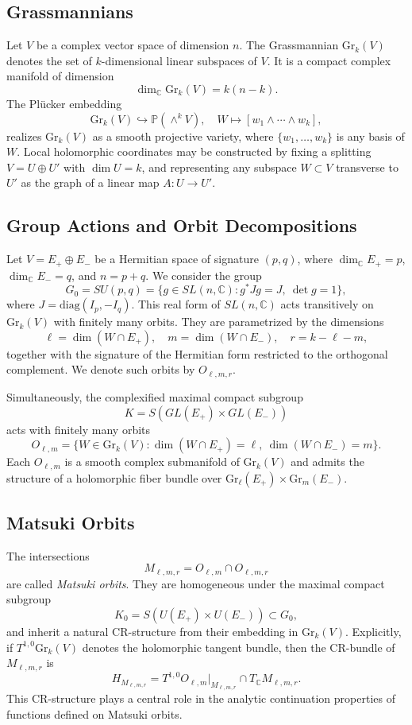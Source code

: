 \documentclass[12pt,a4paper]{article}
\theoremstyle{plain}
\theoremstyle{definition}
\theoremstyle{remark}
\begin{document}
\subsection{Grassmannians}
Let $V$ be a complex vector space of dimension $n$. 
The Grassmannian $\mathrm{Gr}_k(V)$ denotes the set of $k$-dimensional 
linear subspaces of $V$. 
It is a compact complex manifold of dimension
\[
    \dim_{\mathbb{C}} \mathrm{Gr}_k(V) = k(n-k).
\]
The Plücker embedding 
\[
    \mathrm{Gr}_k(V) \hookrightarrow \mathbb{P}(\wedge^k V), \quad 
    W \mapsto [w_1 \wedge \cdots \wedge w_k],
\]
realizes $\mathrm{Gr}_k(V)$ as a smooth projective variety, where 
$\{w_1,\dots,w_k\}$ is any basis of $W$. 
Local holomorphic coordinates may be constructed by fixing a splitting 
$V = U \oplus U'$ with $\dim U = k$, and representing any subspace 
$W \subset V$ transverse to $U'$ as the graph of a linear map 
$A : U \to U'$.

\subsection{Group Actions and Orbit Decompositions}
Let $V = E_+ \oplus E_-$ be a Hermitian space of signature $(p,q)$, 
where $\dim_{\mathbb{C}} E_+ = p$, $\dim_{\mathbb{C}} E_- = q$, 
and $n = p+q$. 
We consider the group
\[
    G_0 = SU(p,q) = \{ g \in SL(n,\mathbb{C}) : g^\ast J g = J, \ \det g = 1 \},
\]
where $J = \mathrm{diag}(I_p, -I_q)$. 
This real form of $SL(n,\mathbb{C})$ acts transitively on $\mathrm{Gr}_k(V)$ 
with finitely many orbits. 
They are parametrized by the dimensions
\[
    \ell = \dim(W \cap E_+), 
    \quad m = \dim(W \cap E_-), 
    \quad r = k-\ell-m,
\]
together with the signature of the Hermitian form restricted to the 
orthogonal complement. 
We denote such orbits by $O_{\ell,m,r}$.

Simultaneously, the complexified maximal compact subgroup 
\[
    K = S(GL(E_+) \times GL(E_-))
\]
acts with finitely many orbits
\[
    O_{\ell,m} = \{ W \in \mathrm{Gr}_k(V) : 
    \dim(W \cap E_+) = \ell, \ \dim(W \cap E_-) = m \}.
\]
Each $O_{\ell,m}$ is a smooth complex submanifold of 
$\mathrm{Gr}_k(V)$ and admits the structure of a holomorphic fiber bundle 
over $\mathrm{Gr}_\ell(E_+) \times \mathrm{Gr}_m(E_-)$.

\subsection{Matsuki Orbits}
The intersections
\[
    M_{\ell,m,r} = O_{\ell,m} \cap O_{\ell,m,r}
\]
are called \emph{Matsuki orbits}. 
They are homogeneous under the maximal compact subgroup
\[
    K_0 = S(U(E_+) \times U(E_-)) \subset G_0,
\]
and inherit a natural CR-structure from their embedding in 
$\mathrm{Gr}_k(V)$. 
Explicitly, if $T^{1,0}\mathrm{Gr}_k(V)$ denotes the holomorphic tangent 
bundle, then the CR-bundle of $M_{\ell,m,r}$ is
\[
    H_{M_{\ell,m,r}} = 
    T^{1,0} O_{\ell,m} \big|_{M_{\ell,m,r}} \cap T_{\mathbb{C}} M_{\ell,m,r}.
\]
This CR-structure plays a central role in the analytic continuation 
properties of functions defined on Matsuki orbits.
\end{document}
